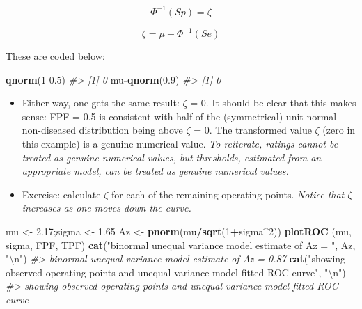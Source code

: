 \documentclass[
]{book}
\newenvironment{Shaded}{\begin{snugshade}}{\end{snugshade}}
\newcommand{\CharTok}[1]{\textcolor[rgb]{0.31,0.60,0.02}{#1}}
\newcommand{\CommentTok}[1]{\textcolor[rgb]{0.56,0.35,0.01}{\textit{#1}}}
\newcommand{\DecValTok}[1]{\textcolor[rgb]{0.00,0.00,0.81}{#1}}
\newcommand{\FloatTok}[1]{\textcolor[rgb]{0.00,0.00,0.81}{#1}}
\newcommand{\KeywordTok}[1]{\textcolor[rgb]{0.13,0.29,0.53}{\textbf{#1}}}
\newcommand{\NormalTok}[1]{#1}
\newcommand{\OperatorTok}[1]{\textcolor[rgb]{0.81,0.36,0.00}{\textbf{#1}}}
\newcommand{\StringTok}[1]{\textcolor[rgb]{0.31,0.60,0.02}{#1}}
\providecommand{\tightlist}{%
  \setlength{\itemsep}{0pt}\setlength{\parskip}{0pt}}
\begin{document}
\begin{equation*} 
\Phi^{-1}\left ( Sp \right )=\zeta
\end{equation*}

\begin{equation*} 
\zeta=\mu - \Phi^{-1}\left ( Se \right )
\end{equation*}

These are coded below:

\begin{Shaded}
\begin{Highlighting}[]
\KeywordTok{qnorm}\NormalTok{(}\DecValTok{1}\FloatTok{{-}0.5}\NormalTok{)}
\CommentTok{\#\textgreater{} [1] 0}
\NormalTok{mu}\OperatorTok{{-}}\KeywordTok{qnorm}\NormalTok{(}\FloatTok{0.9}\NormalTok{)}
\CommentTok{\#\textgreater{} [1] 0}
\end{Highlighting}
\end{Shaded}

\begin{itemize}
\tightlist
\item
  Either way, one gets the same result: \(\zeta\) = 0. It should be clear that this makes sense: FPF = 0.5 is consistent with half of the (symmetrical) unit-normal non-diseased distribution being above \(\zeta\) = 0. The transformed value \(\zeta\) (zero in this example) is a genuine numerical value. \emph{To reiterate, ratings cannot be treated as genuine numerical values, but thresholds, estimated from an appropriate model, can be treated as genuine numerical values.}
\item
  Exercise: calculate \(\zeta\) for each of the remaining operating points. \emph{Notice that \(\zeta\) increases as one moves down the curve.}
\end{itemize}

\begin{Shaded}
\begin{Highlighting}[]
\NormalTok{mu \textless{}{-}}\StringTok{ }\FloatTok{2.17}\NormalTok{;sigma \textless{}{-}}\StringTok{ }\FloatTok{1.65}
\NormalTok{Az \textless{}{-}}\StringTok{ }\KeywordTok{pnorm}\NormalTok{(mu}\OperatorTok{/}\KeywordTok{sqrt}\NormalTok{(}\DecValTok{1}\OperatorTok{+}\NormalTok{sigma}\OperatorTok{\^{}}\DecValTok{2}\NormalTok{))}
\KeywordTok{plotROC}\NormalTok{ (mu, sigma, FPF, TPF)}
\KeywordTok{cat}\NormalTok{(}\StringTok{"binormal unequal variance model estimate of Az = "}\NormalTok{, Az, }\StringTok{"}\CharTok{\textbackslash{}n}\StringTok{"}\NormalTok{)}
\CommentTok{\#\textgreater{} binormal unequal variance model estimate of Az =  0.87}
\KeywordTok{cat}\NormalTok{(}\StringTok{"showing observed operating points and unequal variance model fitted ROC curve"}\NormalTok{, }\StringTok{"}\CharTok{\textbackslash{}n}\StringTok{"}\NormalTok{)}
\CommentTok{\#\textgreater{} showing observed operating points and unequal variance model fitted ROC curve}
\end{Highlighting}
\end{Shaded}
\end{document}

